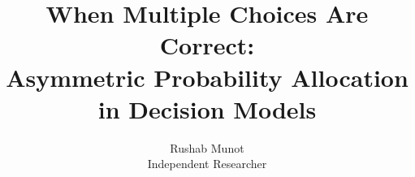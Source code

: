 \documentclass[10pt]{article}
\title{When Multiple Choices Are Correct:\\Asymmetric Probability Allocation in Decision Models}
\author{\name Rushab Munot \\
      \addr Independent Researcher}
\begin{document}
\maketitle

\begin{abstract}

\end{abstract}














\appendix




\end{document}

